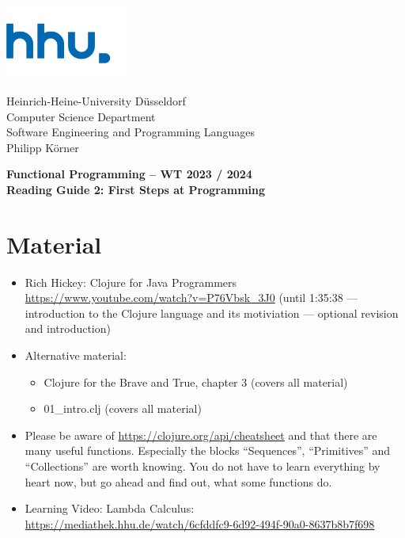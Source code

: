 \documentclass[11pt,a4paper]{article}
\begin{document}
\begin{minipage}[b]{\textwidth}
	\parbox[t]{5cm}{%
		\includegraphics[width=4cm]{unilogo}
		\hfill
	}
	\parbox[b]{11cm}{%
		Heinrich-Heine-University D\"usseldorf\\
		Computer Science Department\\
		Software Engineering and Programming Languages\\
		Philipp K\"orner
	}
\end{minipage}
\begin{center}
	\bf
	Functional Programming -- WT 2023 / 2024\\
	Reading Guide 2: First Steps at Programming
\end{center}

\pagestyle{empty}

\section{Material} 

\begin{itemize}
    \item Rich Hickey: Clojure for Java Programmers \url{https://www.youtube.com/watch?v=P76Vbsk_3J0} (until 1:35:38 --- introduction to the Clojure language and its motiviation --- optional revision and introduction)
    \item Alternative material:
        \begin{itemize}
            \item Clojure for the Brave and True, chapter 3 (covers all material)
            \item 01\_intro.clj (covers all material)
        \end{itemize}
    \item Please be aware of \url{https://clojure.org/api/cheatsheet} and that there are many useful functions.
        Especially the blocks ``Sequences'', ``Primitives'' and ``Collections'' are worth knowing.
        You do not have to learn everything by heart now, but go ahead and find out, what some functions do.
    \item Learning Video: Lambda Calculus: \url{https://mediathek.hhu.de/watch/6cfddfc9-6d92-494f-90a0-8637b8b7f698}
\end{itemize}
\end{document}
